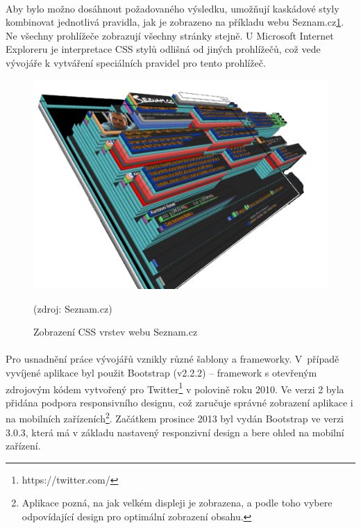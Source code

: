 \documentclass[11pt,a4paper,titlepage,oneside]{book}
\begin{document}

		\paragraph{} Aby bylo možno dosáhnout požadovaného výsledku, umožňují kaskádové styly kombinovat jednotlivá pravidla, jak je zobrazeno na příkladu webu Seznam.cz\ref{fig:seznam}. Ne všechny prohlížeče zobrazují všechny stránky stejně. U Microsoft Internet Exploreru je interpretace CSS stylů odlišná od jiných prohlížečů, což vede vývojáře k vytváření speciálních pravidel pro tento prohlížeč.
		\begin{figure}[!h]
			\begin{center}
				\includegraphics[width=12cm]{obrazky/css_vrstvy.png}
				\caption{Zobrazení CSS vrstev webu Seznam.cz}
				\label{fig:seznam}
				(zdroj: Seznam.cz)
			\end{center}
		\end{figure}	


		\paragraph{} Pro usnadnění práce vývojářů vznikly různé šablony a frameworky. V~pří\-padě vyvíjené aplikace byl použit Bootstrap (v2.2.2) -- framework s otevřeným zdrojovým kódem vytvořený pro Twitter\footnote{https://twitter.com/} v polovině roku 2010. Ve verzi 2 byla přidána podpora responsivního designu, což zaručuje správné zobrazení aplikace i na mobilních zařízeních\footnote{Aplikace pozná, na jak velkém displeji je zobrazena, a podle toho vybere odpovídající design pro optimální zobrazení obsahu.}. Začátkem prosince 2013 byl vydán Bootstrap ve verzi 3.0.3, která má v základu nastavený responzivní design a bere ohled na mobilní zařízení.
\end{document}
